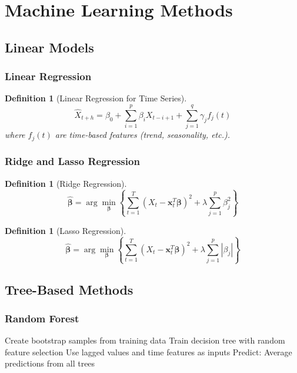 \documentclass[11pt,a4paper]{article}
\newtheorem{definition}[theorem]{Definition}
\begin{document}
\section{Machine Learning Methods}

\subsection{Linear Models}

\subsubsection{Linear Regression}

\begin{definition}[Linear Regression for Time Series]
$$\hat{X}_{t+h} = \beta_0 + \sum_{i=1}^p \beta_i X_{t-i+1} + \sum_{j=1}^q \gamma_j f_j(t)$$
where $f_j(t)$ are time-based features (trend, seasonality, etc.).
\end{definition}

\subsubsection{Ridge and Lasso Regression}

\begin{definition}[Ridge Regression]
$$\hat{\boldsymbol{\beta}} = \arg\min_{\boldsymbol{\beta}} \left\{ \sum_{t=1}^T (X_t - \mathbf{x}_t^T\boldsymbol{\beta})^2 + \lambda \sum_{j=1}^p \beta_j^2 \right\}$$
\end{definition}

\begin{definition}[Lasso Regression]
$$\hat{\boldsymbol{\beta}} = \arg\min_{\boldsymbol{\beta}} \left\{ \sum_{t=1}^T (X_t - \mathbf{x}_t^T\boldsymbol{\beta})^2 + \lambda \sum_{j=1}^p |\beta_j| \right\}$$
\end{definition}

\subsection{Tree-Based Methods}

\subsubsection{Random Forest}

\begin{algorithm}
\caption{Random Forest for Time Series}
\begin{algorithmic}[1]
\STATE Create bootstrap samples from training data
    \STATE Train decision tree with random feature selection
    \STATE Use lagged values and time features as inputs
\ENDFOR
\STATE Predict: Average predictions from all trees
\end{algorithmic}
\end{algorithm}
\end{document}
